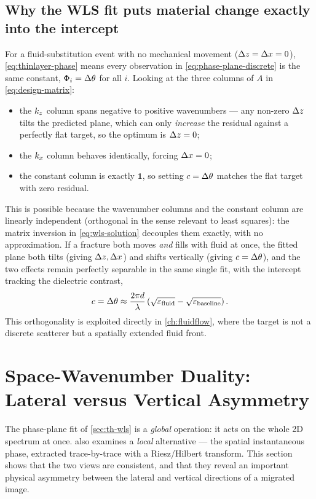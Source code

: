 \subsection{Why the WLS fit puts material change exactly into the intercept}

For a fluid-substitution event with no mechanical movement
($\Delta z=\Delta x=0$), \cref{eq:thinlayer-phase} means every observation in
\cref{eq:phase-plane-discrete} is the same constant, $\Phi_i = \Delta \theta$ for
all $i$. Looking at the three columns of $A$ in \cref{eq:design-matrix}:
\begin{itemize}
  \item the $k_z$ column spans negative to positive wavenumbers --- any
    non-zero $\Delta z$ tilts the predicted plane, which can only \emph{increase}
    the residual against a perfectly flat target, so the optimum is $\Delta z=0$;
  \item the $k_x$ column behaves identically, forcing $\Delta x=0$;
  \item the constant column is exactly $\mathbf 1$, so setting $c=\Delta \theta$
    matches the flat target with zero residual.
\end{itemize}
This is possible because the wavenumber columns and the constant column are
linearly independent (orthogonal in the sense relevant to least squares): the
matrix inversion in \cref{eq:wls-solution} decouples them exactly, with no
approximation. If a fracture both moves \emph{and} fills with fluid at once,
the fitted plane both tilts (giving $\Delta z,\Delta x$) and shifts vertically (giving
$c=\Delta \theta$), and the two effects remain perfectly separable in the same
single fit, with the intercept tracking the dielectric contrast,
\begin{equation}
  c = \Delta \theta \approx \frac{2\pi d}{\lambda}
    \left(\sqrt{\varepsilon_{\mathrm{fluid}}} - \sqrt{\varepsilon_{\mathrm{baseline}}}\right).
  \label{eq:intercept-material}
\end{equation}
This orthogonality is exploited directly in \cref{ch:fluidflow}, where the
target is not a discrete scatterer but a spatially extended fluid front.

\section{Space-Wavenumber Duality: Lateral versus Vertical Asymmetry}
\label{sec:th-duality}

The phase-plane fit of \cref{sec:th-wls} is a \emph{global} operation: it
acts on the whole 2D spectrum at once.  also examines a
\emph{local} alternative --- the spatial instantaneous phase, extracted
trace-by-trace with a Riesz/Hilbert transform. This section shows that the
two views are consistent, and that they reveal an important physical
asymmetry between the lateral and vertical directions of a migrated image.

